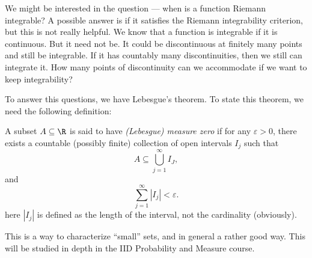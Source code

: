 \documentclass[a4paper]{article}
\begin{document}
We might be interested in the question --- when is a function Riemann integrable? A possible answer is if it satisfies the Riemann integrability criterion, but this is not really helpful. We know that a function is integrable if it is continuous. But it need not be. It could be discontinuous at finitely many points and still be integrable. If it has countably many discontinuities, then we still can integrate it. How many points of discontinuity can we accommodate if we want to keep integrability?

To answer this questions, we have Lebesgue's theorem. To state this theorem, we need the following definition:
\begin{defi}
  A subset $A\subseteq \R$ is said to have \emph{(Lebesgue) measure zero} if for any $\varepsilon > 0$, there exists a countable (possibly finite) collection of open intervals $I_j$ such that
  \[
    A \subseteq \bigcup_{j = 1}^\infty I_J,
  \]
  and
  \[
    \sum_{j = 1}^\infty | I_j| < \varepsilon.
  \]
  here $|I_j|$ is defined as the length of the interval, not the cardinality (obviously).
\end{defi}
This is a way to characterize ``small'' sets, and in general a rather good way. This will be studied in depth in the IID Probability and Measure course.
\end{document}
